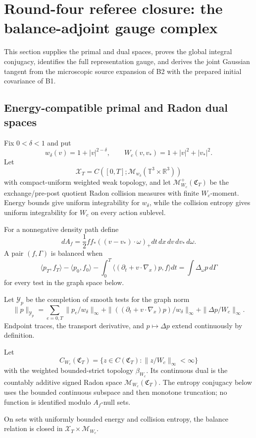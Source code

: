 \section{Round-four referee closure: the balance-adjoint gauge complex}
\label{sec:r3-b3}

This section supplies the primal and dual spaces, proves the global integral
conjugacy, identifies the full representation gauge, and derives the joint
Gaussian tangent from the microscopic source expansion of B2 with the
prepared initial covariance of B1.

\subsection{Energy-compatible primal and Radon dual spaces}

Fix \(0<\delta<1\) and put
\[
 w_\delta(v)=1+|v|^{2-\delta},
 \qquad
 W_c(v,v_*)=1+|v|^2+|v_*|^2.
\]
Let
\[
 \mathcal X_T=C([0,T];\mathcal M_{w_\delta}
 (\mathbb T^3\times\mathbb R^3))
\]
with compact-uniform weighted weak topology, and let
\(\mathcal M_{W_c}^+(\mathfrak C_T)\) be the exchange/pre-post quotient
Radon collision measures with finite \(W_c\)-moment.  Energy bounds give
uniform integrability for \(w_\delta\), while the collision entropy gives
uniform integrability for \(W_c\) on every action sublevel.

For a nonnegative density path define
\[
 dA_f=\frac12ff_*((v-v_*)\cdot\omega)_+
 dt\,dx\,dv\,dv_*\,d\omega.
\]
A pair \((f,\Gamma)\) is balanced when
\[
 \langle p_T,f_T\rangle-\langle p_0,f_0\rangle
 -\int_0^T\langle(\partial_t+v\cdot\nabla_x)p,f\rangle dt
 =\int\Delta_\omega p\,d\Gamma
\]
for every test in the graph space below.

Let \(\mathcal Y_p\) be the completion of smooth tests for the graph norm
\[
 \|p\|_{\mathcal Y_p}
 =\sum_{e=0,T}\|p_e/w_\delta\|_\infty
 +\|((\partial_t+v\cdot\nabla_x)p)/w_\delta\|_\infty
 +\|\Delta p/W_c\|_\infty.
\]
Endpoint traces, the transport derivative, and
\(p\mapsto\Delta p\) extend continuously by definition.

Let
\[
 C_{W_c}(\mathfrak C_T)
 =\{z\in C(\mathfrak C_T):\|z/W_c\|_\infty<\infty\}
\]
with the weighted bounded-strict topology \(\beta_{W_c}\).  Its continuous
dual is the countably additive signed Radon space
\(\mathcal M_{W_c}(\mathfrak C_T)\).  The entropy conjugacy below uses the
bounded continuous subspace and then monotone truncation; no function is
identified modulo \(A_f\)-null sets.

\begin{lemma}
\label{lem:r3-b3-balance-closed}
On sets with uniformly bounded energy and collision entropy, the balance
relation is closed in
\(\mathcal X_T\times\mathcal M_{W_c}\).
\end{lemma}

